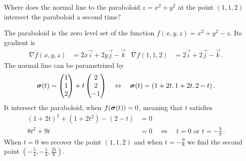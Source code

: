 \begin{question}
Where does the normal line to the paraboloid $z=x^2 + y^2$ at the point $(1,1,2)$ intersect the paraboloid a second time?
\end{question}

\begin{solution}
The paraboloid is the zero level set of the function $f(x,y,z) = x^2 + y^2 - z$. Its gradient is
\begin{align*}
\nabla f(x,y,z) &= 2x\vec i + 2y\vec j - \vec k &
\nabla f(1,1,2) &= 2\vec i + 2\vec j - \vec k\,.
\end{align*}
The normal line can be parametrized by
\[
\bm{\mathrm{\sigma}}(t) = \begin{pmatrix} 1 \\ 1 \\ 2 \end{pmatrix}
+ t \begin{pmatrix} 2 \\ 2 \\ -1 \end{pmatrix}
\quad\Leftrightarrow\quad
\bm{\mathrm{\sigma}}(t) = (1+2t, 1+2t, 2-t)\,.
\]
It intersect the paraboloid, when $f(\bm{\mathrm{\sigma}} (t)) = 0$, meaning that $t$ satisfies
\begin{align*} 
(1+2t)^2 + (1+2t^2) - (2-t) &= 0 \\
8t^2 + 9t &= 0
\quad\Leftrightarrow\quad
t=0 \text{ or } t = -\frac 98\,.
\end{align*}
When $t=0$ we recover the point $(1,1,2)$ and when $t=-\frac 98$ we find the second point
$\left( -\frac 54, -\frac 54, \frac{25}8 \right)$.
\end{solution}

